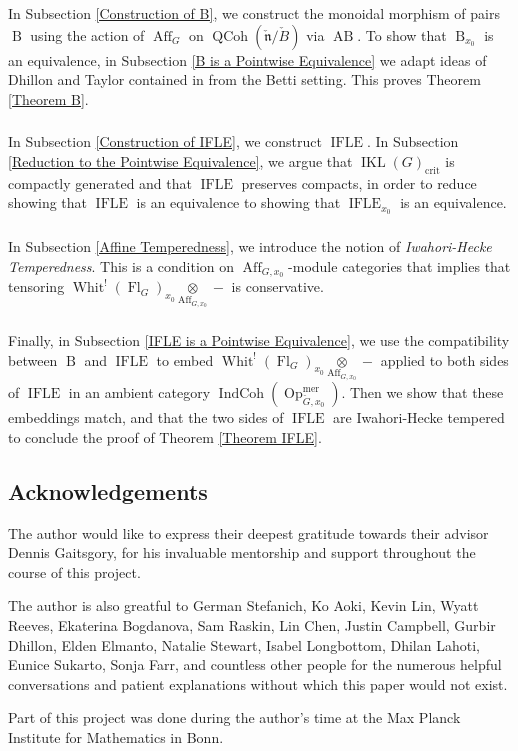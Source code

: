 \documentclass[10pt]{amsart}
\theoremstyle{remark}
\newcommand{\on}[1]{\operatorname{#1}}
\newcommand{\IKL}{\on{IKL}(G)_{\on{crit}}}
\newcommand{\Gcheck}{\check{G}}
\newcommand{\ncheck}{\check{\mathfrak{n}}}
\newcommand{\Bcheck}{\check{B}}
\newcommand{\sssec}[1]{\subsubsection{}}
\begin{document}
\sssec{}
In Subsection \ref{Construction of B}, we construct the monoidal morphism of pairs $\on{B}$ using the action of $\on{Aff}_G$ on $\on{QCoh}(\ncheck/\Bcheck)$ via $\on{AB}$. To show that $\on{B}_{x_0}$ is an equivalence, in Subsection \ref{B is a Pointwise Equivalence} we adapt ideas of Dhillon and Taylor contained in \cite{DT} from the Betti setting. This proves Theorem \ref{Theorem B}.

\sssec{}
In Subsection \ref{Construction of IFLE}, we construct $\on{IFLE}$. In Subsection \ref{Reduction to the Pointwise Equivalence}, we argue that $\IKL$ is compactly generated and that $\on{IFLE}$ preserves compacts, in order to reduce showing that $\on{IFLE}$ is an equivalence to showing that $\on{IFLE}_{x_0}$ is an equivalence.

\sssec{}
In Subsection \ref{Affine Temperedness}, we introduce the notion of \emph{Iwahori-Hecke Temperedness}. This is a condition on $\on{Aff}_{G, x_0}$-module categories that implies that tensoring $\on{Whit}^!(\on{Fl}_G)_{x_0} \underset{\on{Aff}_{G, x_0}}{\otimes} -$ is conservative.

\sssec{}
Finally, in Subsection \ref{IFLE is a Pointwise Equivalence}, we use the compatibility between $\on{B}$ and $\on{IFLE}$ to embed $\on{Whit}^!(\on{Fl}_G)_{x_0} \underset{\on{Aff}_{G, x_0}}{\otimes} -$ applied to both sides of $\on{IFLE}$ in an ambient category $\on{IndCoh}(\on{Op}_{\Gcheck, x_0}^{\on{mer}})$. Then we show that these embeddings match, and that the two sides of $\on{IFLE}$ are Iwahori-Hecke tempered to conclude the proof of Theorem \ref{Theorem IFLE}.


\subsection{Acknowledgements}
The author would like to express their deepest gratitude towards their advisor Dennis Gaitsgory, for his invaluable mentorship and support throughout the course of this project.

The author is also greatful to German Stefanich, Ko Aoki, Kevin Lin, Wyatt Reeves, Ekaterina Bogdanova, Sam Raskin, Lin Chen, Justin Campbell, Gurbir Dhillon, Elden Elmanto, Natalie Stewart, Isabel Longbottom, Dhilan Lahoti, Eunice Sukarto, Sonja Farr, and countless other people for the numerous helpful conversations and patient explanations without which this paper would not exist.

Part of this project was done during the author’s time at the Max Planck Institute for Mathematics in Bonn.
\end{document}
